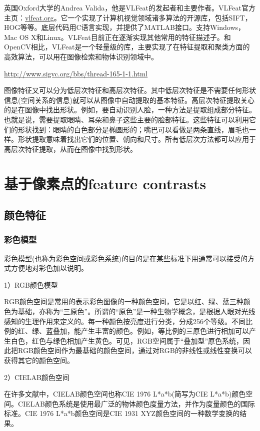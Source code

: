 \documentclass[12pt]{article}
\begin{document}
英国Oxford大学的Andrea Valida，他是VLFeat的发起者和主要作者。VLFeat官方主页：\url{vlfeat.org}。它一个实现了计算机视觉领域诸多算法的开源库，包括SIFT，HOG等等。底层代码用C语言实现，并提供了MATLAB接口。支持Windows，Mac OS X和Linux。VLFeat目前正在逐渐实现其他常用的特征描述子。和OpenCV相比，VLFeat是一个轻量级的库，主要实现了在特征提取和聚类方面的高效算法，可以用在图像检索和物体识别领域中。

\url{http://www.sigvc.org/bbs/thread-165-1-1.html}

图像特征又可以分为低层次特征和高层次特征。其中低层次特征是不需要任何形状信息(空间关系的信息)就可以从图像中自动提取的基本特征。高层次特征提取关心的是在图像中找出形状。例如，要自动识别人脸，一种方法是提取组成部分特征。也就是说，需要提取眼睛、耳朵和鼻子这些主要的脸部特征。这些特征可以利用它们的形状找到：眼睛的白色部分是椭圆形的；嘴巴可以看做是两条直线，眉毛也一样。形状提取意味着找出它们的位置、朝向和尺寸。所有低层次方法都可以应用于高层次特征提取，从而在图像中找到形状。

\section{基于像素点的feature contrasts}

\subsection{颜色特征}

\subsubsection{彩色模型}

彩色模型(也称为彩色空间或彩色系统)的目的是在某些标准下用通常可以接受的方式方便地对彩色加以说明。

1）RGB颜色模型

RGB颜色空间是常用的表示彩色图像的一种颜色空间，它是以红、绿、蓝三种颜色为基础，亦称为“三原色”。所谓的“原色”是一种生物学概念，是根据人眼对光线感知的生理作用来定义的。每一种颜色按亮度进行分类，分成256个等级。不同比例的红、绿、蓝叠加，能产生丰富的颜色。例如，等比例的三原色进行相加可以产生白色，红色与绿色相加产生黄色。可见，RGB空间属于“叠加型”原色系统，因此把RGB颜色空间作为最基础的颜色空间，通过对RGB的非线性或线性变换可以获得其它的颜色空间。

2）CIELAB颜色空间

在许多文献中，CIELAB颜色空间也称CIE 1976 L*a*b(简写为CIE L*a*b)颜色空间。CIELAB颜色系统是使用最广泛的物体颜色度量方法，并作为度量颜色的国际标准。CIE 1976 L*a*b颜色空间是CIE 1931 XYZ颜色空间的一种数学变换的结果。
\end{document}
